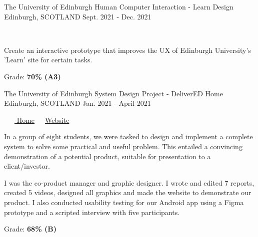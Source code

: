 \begin{cventries}
  \cventry
    {The University of Edinburgh} %
    {Human Computer Interaction - Learn Design} %
    {Edinburgh, SCOTLAND} %
    {Sept. 2021 - Dec. 2021} %
    {
      \color{awesome}\color{graytext}\ \ \ \href{https://www.figma.com/proto/Q6wnTtZs5rP21QqnWcJBP6/G42-CW3?node-id=0\%3A1}{\faFigma\acvHeaderIconSep\@Prototype}
      \vspace{1.6em}
      \begin{cvitems} %
        \item Create an interactive prototype that improves the UX of Edinburgh University's 'Learn' site for certain tasks.
        \item Grade: \textbf{70\% (A3)}
      \end{cvitems}
    }
    
  \cventry
    {The University of Edinburgh} %
    {System Design Project - DeliverED Home} %
    {Edinburgh, SCOTLAND} %
    {Jan. 2021 - April 2021} %
    {
      \color{awesome}     \color{graytext}\ \ \ \href{https://github.com/DeliverED-Home}{\faGithub\acvHeaderIconSep\@DeliverED-Home}\ \ \ \href{https://DeliverED-Home.github.io/DeliverED-Site}{\faGlobe\acvHeaderIconSep\@Product Website}
      \vspace{1.6em}
      \begin{cvitems} %
        \item In a group of eight students, we were tasked to design and implement a complete system to solve some practical and useful problem. This entailed a convincing demonstration of a potential product, suitable for presentation to a client/investor.
        \item I was the co-product manager and graphic designer. I wrote and edited 7 reports, created 5 videos, designed all graphics and made the website to demonstrate our product. I also conducted usability testing for our Android app using a Figma prototype and a scripted interview with five participants.
        \item Grade: \textbf{68\% (B)}
      \end{cvitems}
    }
    

\end{cventries}
